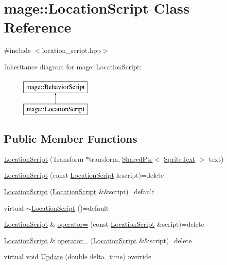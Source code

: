 \hypertarget{classmage_1_1_location_script}{}\section{mage\+:\+:Location\+Script Class Reference}
\label{classmage_1_1_location_script}


{\ttfamily \#include $<$location\+\_\+script.\+hpp$>$}

Inheritance diagram for mage\+:\+:Location\+Script\+:\begin{figure}[H]
\begin{center}
\leavevmode
\includegraphics[height=2.000000cm]{classmage_1_1_location_script}
\end{center}
\end{figure}
\subsection*{Public Member Functions}
\begin{DoxyCompactItemize}
\item 
\hyperlink{classmage_1_1_location_script_a6ba4b1c4a698ab5ea0d7deb7ffa58bed}{Location\+Script} (Transform $\ast$transform, \hyperlink{namespacemage_a1e01ae66713838a7a67d30e44c67703e}{Shared\+Ptr}$<$ \hyperlink{classmage_1_1_sprite_text}{Sprite\+Text} $>$ text)
\item 
\hyperlink{classmage_1_1_location_script_a53fb0562896eadb4c747d53b53f65b40}{Location\+Script} (const \hyperlink{classmage_1_1_location_script}{Location\+Script} \&script)=delete
\item 
\hyperlink{classmage_1_1_location_script_accb7888321a94d093634e10360f9d659}{Location\+Script} (\hyperlink{classmage_1_1_location_script}{Location\+Script} \&\&script)=default
\item 
virtual \hyperlink{classmage_1_1_location_script_ae51f38f597f34536a80ca6b08d044811}{$\sim$\+Location\+Script} ()=default
\item 
\hyperlink{classmage_1_1_location_script}{Location\+Script} \& \hyperlink{classmage_1_1_location_script_a49409b091dbd1b93830c46831be453fb}{operator=} (const \hyperlink{classmage_1_1_location_script}{Location\+Script} \&script)=delete
\item 
\hyperlink{classmage_1_1_location_script}{Location\+Script} \& \hyperlink{classmage_1_1_location_script_a6e2ad5cd12a984d38c66bbcc81fef94b}{operator=} (\hyperlink{classmage_1_1_location_script}{Location\+Script} \&\&script)=delete
\item 
virtual void \hyperlink{classmage_1_1_location_script_a3ffe0474c573e2cf858aee62056324a3}{Update} (double delta\+\_\+time) override
\end{DoxyCompactItemize}

